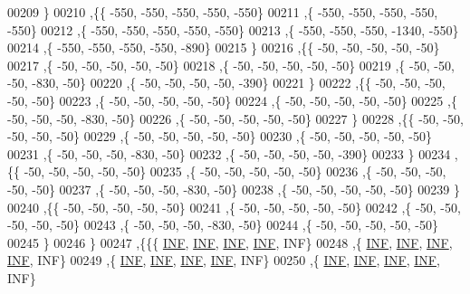 \begin{DoxyCode}
00209   \}
00210  ,\{\{  -550,  -550,  -550,  -550,  -550\}
00211   ,\{  -550,  -550,  -550,  -550,  -550\}
00212   ,\{  -550,  -550,  -550,  -550,  -550\}
00213   ,\{  -550,  -550,  -550, -1340,  -550\}
00214   ,\{  -550,  -550,  -550,  -550,  -890\}
00215   \}
00216  ,\{\{   -50,   -50,   -50,   -50,   -50\}
00217   ,\{   -50,   -50,   -50,   -50,   -50\}
00218   ,\{   -50,   -50,   -50,   -50,   -50\}
00219   ,\{   -50,   -50,   -50,  -830,   -50\}
00220   ,\{   -50,   -50,   -50,   -50,  -390\}
00221   \}
00222  ,\{\{   -50,   -50,   -50,   -50,   -50\}
00223   ,\{   -50,   -50,   -50,   -50,   -50\}
00224   ,\{   -50,   -50,   -50,   -50,   -50\}
00225   ,\{   -50,   -50,   -50,  -830,   -50\}
00226   ,\{   -50,   -50,   -50,   -50,   -50\}
00227   \}
00228  ,\{\{   -50,   -50,   -50,   -50,   -50\}
00229   ,\{   -50,   -50,   -50,   -50,   -50\}
00230   ,\{   -50,   -50,   -50,   -50,   -50\}
00231   ,\{   -50,   -50,   -50,  -830,   -50\}
00232   ,\{   -50,   -50,   -50,   -50,  -390\}
00233   \}
00234  ,\{\{   -50,   -50,   -50,   -50,   -50\}
00235   ,\{   -50,   -50,   -50,   -50,   -50\}
00236   ,\{   -50,   -50,   -50,   -50,   -50\}
00237   ,\{   -50,   -50,   -50,  -830,   -50\}
00238   ,\{   -50,   -50,   -50,   -50,   -50\}
00239   \}
00240  ,\{\{   -50,   -50,   -50,   -50,   -50\}
00241   ,\{   -50,   -50,   -50,   -50,   -50\}
00242   ,\{   -50,   -50,   -50,   -50,   -50\}
00243   ,\{   -50,   -50,   -50,  -830,   -50\}
00244   ,\{   -50,   -50,   -50,   -50,   -50\}
00245   \}
00246  \}
00247 ,\{\{\{   \hyperlink{constants_8h_a12c2040f25d8e3a7b9e1c2024c618cb6}{INF},   \hyperlink{constants_8h_a12c2040f25d8e3a7b9e1c2024c618cb6}{INF},   \hyperlink{constants_8h_a12c2040f25d8e3a7b9e1c2024c618cb6}{INF},   \hyperlink{constants_8h_a12c2040f25d8e3a7b9e1c2024c618cb6}{INF},   INF\}
00248   ,\{   \hyperlink{constants_8h_a12c2040f25d8e3a7b9e1c2024c618cb6}{INF},   \hyperlink{constants_8h_a12c2040f25d8e3a7b9e1c2024c618cb6}{INF},   \hyperlink{constants_8h_a12c2040f25d8e3a7b9e1c2024c618cb6}{INF},   \hyperlink{constants_8h_a12c2040f25d8e3a7b9e1c2024c618cb6}{INF},   INF\}
00249   ,\{   \hyperlink{constants_8h_a12c2040f25d8e3a7b9e1c2024c618cb6}{INF},   \hyperlink{constants_8h_a12c2040f25d8e3a7b9e1c2024c618cb6}{INF},   \hyperlink{constants_8h_a12c2040f25d8e3a7b9e1c2024c618cb6}{INF},   \hyperlink{constants_8h_a12c2040f25d8e3a7b9e1c2024c618cb6}{INF},   INF\}
00250   ,\{   \hyperlink{constants_8h_a12c2040f25d8e3a7b9e1c2024c618cb6}{INF},   \hyperlink{constants_8h_a12c2040f25d8e3a7b9e1c2024c618cb6}{INF},   \hyperlink{constants_8h_a12c2040f25d8e3a7b9e1c2024c618cb6}{INF},   \hyperlink{constants_8h_a12c2040f25d8e3a7b9e1c2024c618cb6}{INF},   INF\}

\end{DoxyCode}
